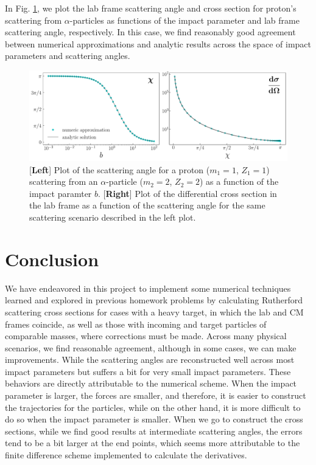 In Fig. \ref{fig:part2-xsec}, we plot the lab frame scattering angle and cross section for proton's scattering from $\alpha$-particles as functions of the impact parameter and lab frame scattering angle, respectively.
In this case, we find reasonably good agreement between numerical approximations and analytic results across the space of impact parameters and scattering angles.

\begin{figure}[h!tb]
    \centering
    \includegraphics[width=\textwidth]{part2-xsec.pdf}
    \caption{[\textbf{Left}] Plot of the scattering angle for a proton ($m_1 = 1$, $Z_1 = 1$) scattering from an $\alpha$-particle ($m_2 = 2$, $Z_2 = 2$) as a function of the impact paramter $b$. [\textbf{Right}] Plot of the differential cross section in the lab frame as a function of the scattering angle for the same scattering scenario described in the left plot.}
    \label{fig:part2-xsec}
\end{figure}


\section{Conclusion}
\label{sec:conclusion}

We have endeavored in this project to implement some numerical techniques learned and explored in previous homework problems by calculating Rutherford scattering cross sections for cases with a heavy target, in which the lab and CM frames coincide, as well as those with incoming and target particles of comparable masses, where corrections must be made.
Across many physical scenarios, we find reasonable agreement, although in some cases, we can make improvements.
While the scattering angles are reconstructed well across most impact parameters but suffers a bit for very small impact parameters.
These behaviors are directly attributable to the numerical scheme.
When the impact parameter is larger, the forces are smaller, and therefore, it is easier to construct the trajectories for the particles, while on the other hand, it is more difficult to do so when the impact parameter is smaller.
When we go to construct the cross sections, while we find good results at intermediate scattering angles, the errors tend to be a bit larger at the end points, which seems more attributable to the finite difference scheme implemented to calculate the derivatives.

